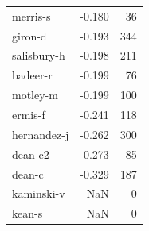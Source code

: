 \documentclass{vldb}
\begin{document}
\begin{appendix}
\begin{supertabular}{ l r r }
merris-s       &                -0.180 &      36 \\
giron-d        &                -0.193 &     344 \\
salisbury-h    &                -0.198 &     211 \\
badeer-r       &                -0.199 &      76 \\
motley-m       &                -0.199 &     100 \\
ermis-f        &                -0.241 &     118 \\
hernandez-j    &                -0.262 &     300 \\
dean-c2        &                -0.273 &      85 \\
dean-c         &                -0.329 &     187 \\
kaminski-v     &                   NaN &       0 \\
kean-s         &                   NaN &       0 \\
\bottomrule
\end{supertabular}


\end{appendix}
\end{document}

